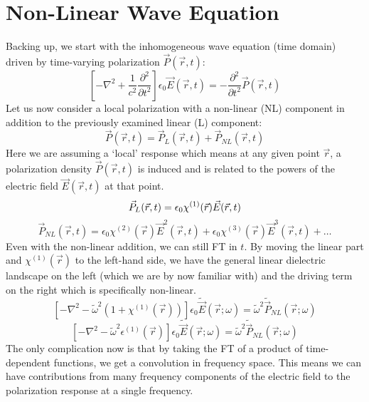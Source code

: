 \documentclass[12pt]{article}
\begin{document}
\section{Non-Linear Wave Equation}
Backing up, we start with the inhomogeneous wave equation (time domain) driven by time-varying polarization $\vec{P}(\vec{r}, t)$:
\begin{equation*}
\left[ -\nabla^2 + \frac{1}{c^2} \frac{\partial^2}{\partial t^2} \right] \epsilon_0 \vec{E}(\vec{r}, t) = -\frac{\partial^2}{\partial t^2} \vec{P}(\vec{r}, t)
\end{equation*}
Let us now consider a local polarization with a non-linear (NL) component in addition to the previously examined linear (L) component:
\begin{equation*}
\vec{P}(\vec{r}, t) = \vec{P}_L(\vec{r}, t) + \vec{P}_{NL}(\vec{r}, t)
\end{equation*}
Here we are assuming a ‘local’ response which means at any given point $\vec{r}$, a polarization density $\vec{P}(\vec{r},t)$ is induced and is related to the powers of the electric field $\vec{E}(\vec{r},t)$ at that point.
\begin{equation*}
\vec{P}_L(\vec{r}, t) = \epsilon_0 \chi^{(1)}(\vec{r}) \vec{E}(\vec{r}, t) \\
\end{equation*}
\begin{equation*}
\vec{P}_{NL}(\vec{r}, t) = \epsilon_0 \chi^{(2)}(\vec{r}) \vec{E}^2(\vec{r}, t) + \epsilon_0 \chi^{(3)}(\vec{r}) \vec{E}^3(\vec{r}, t) + \dots
\end{equation*}
Even with the non-linear addition, we can still FT in $t$. By moving the linear part and $\chi^{(1)}(\vec{r})$ to the left-hand side, we have the general linear dielectric landscape on the left (which we are by now familiar with) and the driving term on the right which is specifically non-linear.
\begin{equation*}
\left[ -\nabla^2 - \tilde{\omega}^2 (1 + \chi^{(1)}(\vec{r})) \right] \epsilon_0 \tilde{\vec{E}}(\vec{r}; \omega) = \tilde{\omega}^2 \tilde{\vec{P}}_{NL}(\vec{r}; \omega)
\end{equation*}
\begin{equation*}
\left[ -\nabla^2 - \tilde{\omega}^2 \epsilon^{(1)}(\vec{r}) \right] \epsilon_0 \tilde{\vec{E}}(\vec{r}; \omega) = \tilde{\omega}^2 \tilde{\vec{P}}_{NL}(\vec{r}; \omega)
\end{equation*}
The only complication now is that by taking the FT of a product of time-dependent functions, we get a convolution in frequency space. This means we can have contributions from many frequency components of the electric field to the polarization response at a single frequency.
\end{document}
